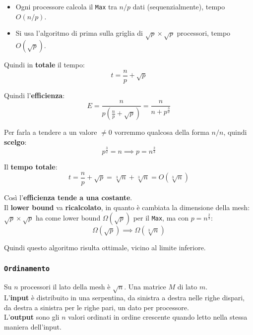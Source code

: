 \begin{itemize}
	\item Ogni processore calcola il \texttt{Max} tra $n/p$ dati (sequenzialmente), tempo $O(n/p)$.\\
	
	\item Si usa l'algoritmo di prima sulla griglia di $\sqrt{p} \times \sqrt{p}$ processori, tempo $O(\sqrt{p})$.\\
\end{itemize}

Quindi in \textbf{totale} il tempo: 
$$ t = \frac{n}{p} + \sqrt{p} $$

Quindi l'\textbf{efficienza}: 
$$ E = \frac{n}{p\left(\frac{n}{p} + \sqrt{p}\right)} = \frac{n}{n + p^{\frac{3}{2}}}$$

Per farla a tendere a un valore $\neq0$ vorremmo qualcosa della forma $n/n$, quindi \textbf{scelgo}:
$$ p^{\frac{3}{2}} = n \implies p = n^{\frac{2}{3}} $$

Il \textbf{tempo totale}: 
$$ t = \frac{n}{p} + \sqrt{p} = \sqrt[3]{n} + \sqrt[3]{n} = O (\sqrt[3]{n}) $$

Così l'\textbf{efficienza tende a una costante}.\\

Il \textbf{lower bound} va \textbf{ricalcolato}, in quanto è cambiata la dimensione della mesh: $\sqrt{p} \times \sqrt{p}$ ha come lower bound $\Omega (\sqrt{p})$ per il \texttt{Max}, ma con $p = n^{\frac{2}{3}}$:
$$ \Omega (\sqrt{p}) \implies \Omega (\sqrt[3]{n}) $$

Quindi questo algoritmo risulta ottimale, vicino al limite inferiore.\\

\newpage

\subsubsection{\texttt{Ordinamento}}

Su $n$ processori il lato della mesh è $\sqrt{n}$. Una matrice $M$ di lato $m$. \\

L'\textbf{input} è distribuito in una serpentina, da sinistra a destra nelle righe dispari, da destra a sinistra per le righe pari, un dato per processore.\\
L'\textbf{output} sono gli $n$ valori ordinati in ordine crescente quando letto nella stessa maniera dell'input.\\

